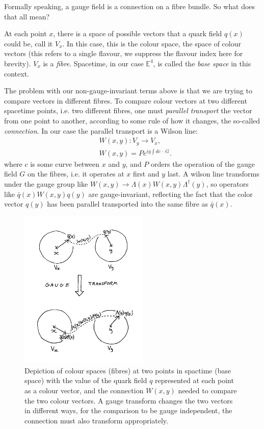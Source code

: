 Formally speaking, a gauge field is a connection on a fibre bundle. So what does that all mean?

At each point $x$, there is a space of possible vectors that a quark field $q(x)$ could be, call it $V_x$. In this case, this is the colour space, the space of colour vectors (this refers to a single flavour, we suppress the flavour index here for brevity). $V_x$ is a {\it{fibre}}. Spacetime, in our case $\mathbb{E}^4$, is called the {\it{base space}} in this context.

The problem with our non-gauge-invariant terms above is that we are trying to compare vectors in different fibres. To compare colour vectors at two different spacetime points, i.e. two different fibres, one must {\it{parallel transport}} the vector from one point to another, according to some rule of how it changes, the so-called {\it{connection}}. In our case the parallel transport is a Wilson line:
\begin{align}
  \nonumber  &W(x,y) : V_y \to V_x, \\ &W(x,y) = Pe^{ig\int dc\,\cdot\, G }.
\end{align}
where $c$ is some curve between $x$ and $y$, and $P$ orders the operation of the gauge field $G$ on the fibres, i.e. it operates at $x$ first and $y$ last. A wilson line transforms under the gauge group like $W(x,y)\to \Lambda(x)W(x,y)\Lambda^{\dagger}(y)$, so operators like $\bar{q}(x)W(x,y)q(y)$ are gauge-invariant, reflecting the fact that the color vector $q(y)$ has been parallel transported into the same fibre as $\bar{q}(x)$.

\begin{figure}
  \begin{center}
    \vspace{-10pt}
    \includegraphics[width=0.55\textwidth]{images/fibres.jpg}
    \caption{Depiction of colour spaces (fibres) at two points in spactime (base space) with the value of the quark field $q$ represented at each point as a colour vector, and the connection $W(x,y)$ needed to compare the two colour vectors. A gauge transform changes the two vectors in different ways, for the comparison to be gauge independent, the connection must also transform appropriately.}
  \end{center}
  \vspace{-10pt}
\end{figure}

